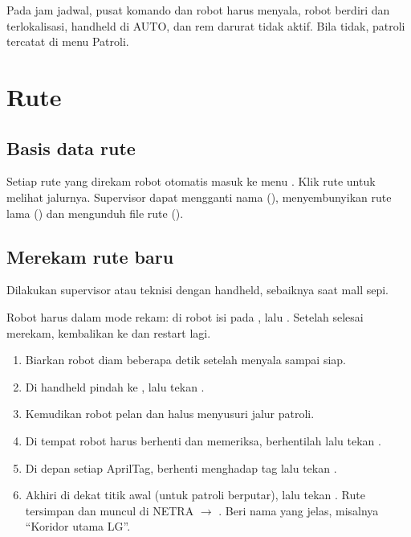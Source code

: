 \documentclass[11pt]{article}
\newcommand{\ra}{\ensuremath{\rightarrow}}
\begin{document}
\begin{penting}
Pada jam jadwal, pusat komando dan robot harus menyala, robot berdiri dan terlokalisasi, handheld di
AUTO, dan rem darurat tidak aktif. Bila tidak, patroli tercatat  di menu Patroli.
\end{penting}

\section{Rute}

\subsection{Basis data rute}
Setiap rute yang direkam robot otomatis masuk ke menu . Klik rute untuk melihat jalurnya. Supervisor
dapat mengganti nama (), menyembunyikan rute lama () dan mengunduh
file rute ().

\subsection{Merekam rute baru}
Dilakukan supervisor atau teknisi dengan handheld, sebaiknya saat mall sepi.

\begin{teknisi}
Robot harus dalam mode rekam: di robot isi  pada ,
lalu . Setelah selesai merekam, kembalikan ke
 dan restart lagi.
\end{teknisi}

\begin{enumerate}
  \item Biarkan robot diam beberapa detik setelah menyala sampai siap.
  \item Di handheld pindah ke , lalu tekan .
  \item Kemudikan robot pelan dan halus menyusuri jalur patroli.
  \item Di tempat robot harus berhenti dan memeriksa, berhentilah lalu tekan .
  \item Di depan setiap AprilTag, berhenti menghadap tag lalu tekan .
  \item Akhiri di dekat titik awal (untuk patroli berputar), lalu tekan . Rute tersimpan
        dan muncul di NETRA \ra{} . Beri nama yang jelas, misalnya ``Koridor utama LG''.
\end{enumerate}
\end{document}
